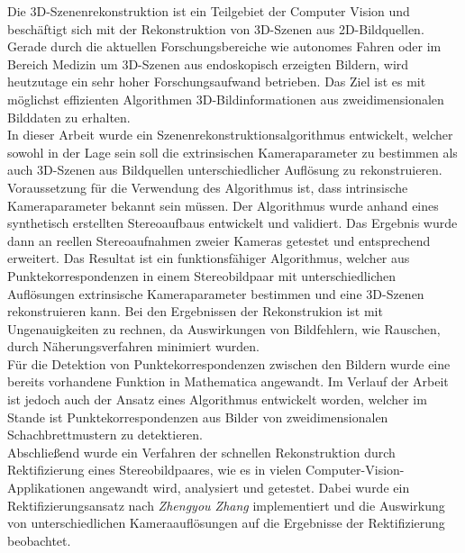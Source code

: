 

Die 3D-Szenenrekonstruktion ist ein Teilgebiet der Computer Vision und beschäftigt sich mit der Rekonstruktion von 3D-Szenen aus 2D-Bildquellen. Gerade durch die aktuellen Forschungsbereiche wie autonomes Fahren oder im Bereich Medizin um 3D-Szenen aus endoskopisch erzeigten Bildern, wird heutzutage ein sehr hoher Forschungsaufwand betrieben. Das Ziel ist es mit möglichst effizienten Algorithmen 3D-Bildinformationen aus zweidimensionalen Bilddaten zu erhalten.\\

In dieser Arbeit wurde ein Szenenrekonstruktionsalgorithmus entwickelt, welcher sowohl in der Lage sein soll die extrinsischen Kameraparameter zu bestimmen als auch 3D-Szenen aus Bildquellen unterschiedlicher Auflösung zu rekonstruieren. Voraussetzung für die Verwendung des Algorithmus ist, dass intrinsische Kameraparameter bekannt sein müssen. Der Algorithmus wurde anhand eines synthetisch erstellten Stereoaufbaus entwickelt und validiert. Das Ergebnis wurde dann an reellen Stereoaufnahmen zweier Kameras getestet und entsprechend erweitert. Das Resultat ist ein funktionsfähiger Algorithmus, welcher aus Punktekorrespondenzen in einem Stereobildpaar mit unterschiedlichen Auflösungen extrinsische Kameraparameter bestimmen und eine 3D-Szenen rekonstruieren kann. Bei den Ergebnissen der Rekonstrukion ist mit Ungenauigkeiten zu rechnen, da Auswirkungen von Bildfehlern, wie Rauschen, durch Näherungsverfahren minimiert wurden.\\

Für die Detektion von Punktekorrespondenzen zwischen den Bildern wurde eine bereits vorhandene Funktion in Mathematica angewandt. Im Verlauf der Arbeit ist jedoch auch der Ansatz eines Algorithmus entwickelt worden, welcher im Stande ist Punktekorrespondenzen aus Bilder von zweidimensionalen Schachbrettmustern zu detektieren. \\ 

%

Abschließend wurde ein Verfahren der schnellen Rekonstruktion durch Rektifizierung eines Stereobildpaares, wie es in vielen Computer-Vision-Applikationen angewandt wird, analysiert und getestet. Dabei wurde ein Rektifizierungsansatz nach \textit{Zhengyou Zhang} implementiert und die Auswirkung von unterschiedlichen Kameraauflösungen auf die Ergebnisse der Rektifizierung beobachtet.  

